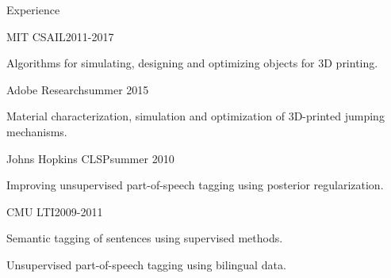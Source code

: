 \documentclass{resume} %
\begin{document}
\begin{rSection}{Experience}

\begin{rSubsection}{MIT CSAIL}{2011-2017}{}{}
\item Algorithms for simulating, designing and optimizing objects for 3D printing.
\end{rSubsection}



\begin{rSubsection}{Adobe Research}{summer 2015}{}{}
\item Material characterization, simulation and optimization of 3D-printed jumping mechanisms.
\end{rSubsection}

\begin{rSubsection}{Johns Hopkins CLSP}{summer 2010}{}{}
\item Improving unsupervised part-of-speech tagging using posterior regularization.
\end{rSubsection}

\begin{rSubsection}{CMU LTI}{2009-2011}{}{}
\item Semantic tagging of sentences using supervised methods.
\item Unsupervised part-of-speech tagging using bilingual data.
\end{rSubsection}

\end{rSection}
\end{document}
